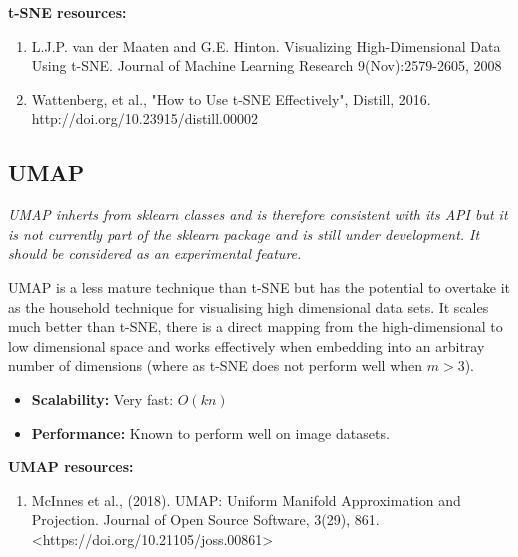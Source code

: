 \documentclass[11pt]{article} %
\begin{document}
\textbf{t-SNE resources:}

\begin{enumerate}
	\item L.J.P. van der Maaten and G.E. Hinton. Visualizing High-Dimensional Data Using t-SNE. Journal of Machine Learning Research 9(Nov):2579-2605, 2008
	\item Wattenberg, et al., "How to Use t-SNE Effectively", Distill, 2016. http://doi.org/10.23915/distill.00002
\end{enumerate}

\subsection{UMAP}

\textit{UMAP inherts from  sklearn classes and is therefore consistent with its API but it is not currently part of the sklearn package and is still under development. It should be considered as an experimental feature.}


UMAP is a less mature technique than t-SNE but has the potential to overtake it as the household technique for visualising high dimensional data sets. It scales much better than t-SNE, there is a direct mapping from the high-dimensional to low dimensional space and works effectively when embedding into an arbitray number of dimensions (where as t-SNE does not perform well when $m>3$).

\begin{itemize}
\item \textbf{Scalability:}  Very fast: $O(kn)$
\item \textbf{Performance:} Known to perform well on image datasets.
\end{itemize}

\textbf{UMAP resources:}

\begin{enumerate}
\item  McInnes et al., (2018). UMAP: Uniform Manifold Approximation and Projection. Journal of Open Source Software, 3(29), 861. <https://doi.org/10.21105/joss.00861>
\end{enumerate}
\end{document}
